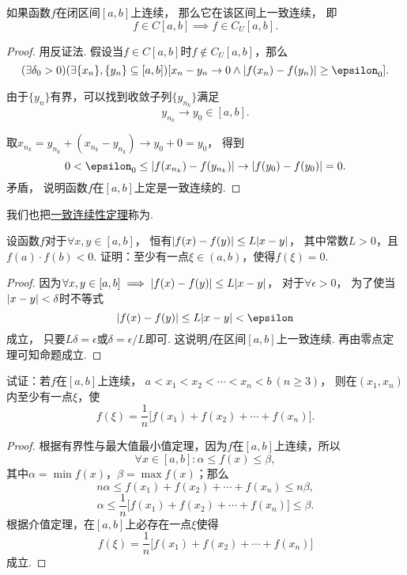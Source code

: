 \begin{theorem}[一致连续性定理]\label{theorem:极限.一致连续性定理}
如果函数\(f\)在闭区间\([a,b]\)上连续，
那么它在该区间上一致连续，
即\[
	f \in C[a,b]
	\implies
	f \in C_U[a,b].
\]
\begin{proof}
用反证法.
假设当\(f \in C[a,b]\)时\(f \notin C_U[a,b]\)，那么\[
	(\exists\delta_0>0)
	(\exists\{x_n\},\{y_n\}\subseteq[a,b])
	[
		x_n-y_n\to0
		\land
		\abs{f(x_n)-f(y_n)}\geq\epsilon_0
	].
\]

由于\(\{y_n\}\)有界，可以找到收敛子列\(\{y_{n_k}\}\)满足\[
	y_{n_k} \to y_0\in[a,b].
\]

取\(x_{n_k} = y_{n_k} + (x_{n_k} - y_{n_k})
\to y_0 + 0 = y_0\)，
得到\[
	0 < \epsilon_0 \leq \abs{f(x_{n_k})-f(y_{n_k})}
	\to \abs{f(y_0)-f(y_0)} = 0.
\]矛盾，
说明函数\(f\)在\([a,b]\)上定是一致连续的.
\end{proof}
\end{theorem}
我们也把\hyperref[theorem:极限.一致连续性定理]{一致连续性定理}称为.

\begin{example}
设函数\(f\)对于\(\forall x,y \in [a,b]\)，
恒有\(\abs{f(x) - f(y)} \leq L \abs{x - y}\)，
其中常数\(L > 0\)，且\(f(a) \cdot f(b) < 0\).
证明：至少有一点\(\xi \in (a,b)\)，使得\(f(\xi) = 0\).
\begin{proof}
因为\(\forall x,y \in [a,b] \implies \abs{f(x) - f(y)} \leq L \abs{x - y}\)，
对于\(\forall \epsilon > 0\)，
为了使当\(\abs{x - y} < \delta\)时不等式\[
\abs{f(x) - f(y)} \leq L \abs{x - y} < \epsilon
\]成立，
只要\(L \delta = \epsilon\)或\(\delta = \epsilon / L\)即可.
这说明\(f\)在区间\([a,b]\)上一致连续.
再由零点定理可知命题成立.
\end{proof}
\end{example}

\begin{example}
试证：若\(f\)在\([a,b]\)上连续，
\(a < x_1 < x_2 < \dotsb < x_n < b \ (n \geq 3)\)，
则在\((x_1,x_n)\)内至少有一点\(\xi\)，使\[
f(\xi) = \frac{1}{n} \bigl[
	f(x_1) + f(x_2) + \dotsb + f(x_n)
\bigr].
\]
\begin{proof}
根据有界性与最大值最小值定理，因为\(f\)在\([a,b]\)上连续，所以\[
\forall x \in [a,b] :
	\alpha \leq f(x) \leq \beta,
\]其中\(\alpha = \min f(x)\)，\(\beta = \max f(x)\)；那么\[
n \alpha \leq f(x_1) + f(x_2) + \dotsb + f(x_n) \leq n \beta,
\]\[
\alpha \leq \frac{1}{n} \bigl[f(x_1) + f(x_2) + \dotsb + f(x_n)\bigr] \leq \beta.
\]根据介值定理，在\([a,b]\)上必存在一点\(\xi\)使得\[
f(\xi) = \frac{1}{n} \bigl[ f(x_1) + f(x_2) + \dotsb + f(x_n) \bigr]
\]成立.
\end{proof}
\end{example}

